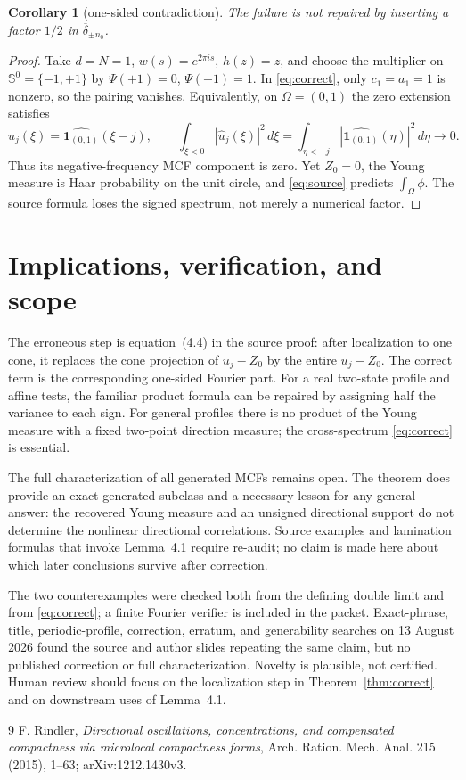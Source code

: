 \documentclass[11pt]{article}
\newtheorem{corollary}[theorem]{Corollary}
\newcommand{\Sph}{\mathbb S}
\newcommand{\one}{\mathbf 1}
\begin{document}
\begin{corollary}[one-sided contradiction]\label{cor:complex}
The failure is not repaired by inserting a factor $1/2$ in
$\overline\delta_{\pm n_0}$.
\end{corollary}

\begin{proof}
Take $d=N=1$, $w(s)=e^{2\pi i s}$, $h(z)=z$, and choose the multiplier on
$\Sph^0=\{-1,+1\}$ by $\Psi(+1)=0$, $\Psi(-1)=1$.  In
\eqref{eq:correct}, only $c_1=a_1=1$ is nonzero, so the pairing vanishes.
Equivalently, on $\Omega=(0,1)$ the zero extension satisfies
\[
 \widehat u_j(\xi)=\widehat{\one_{(0,1)}}(\xi-j),\qquad
 \int_{\xi<0}|\widehat u_j(\xi)|^2\,d\xi
 =\int_{\eta<-j}|\widehat{\one_{(0,1)}}(\eta)|^2\,d\eta\longrightarrow0.
\]
Thus its negative-frequency MCF component is zero.  Yet $Z_0=0$, the Young
measure is Haar probability on the unit circle, and \eqref{eq:source}
predicts $\int_\Omega\phi$.  The source formula loses the signed spectrum,
not merely a numerical factor.
\end{proof}

\section{Implications, verification, and scope}

The erroneous step is equation~(4.4) in the source proof: after localization
to one cone, it replaces the cone projection of $u_j-Z_0$ by the entire
$u_j-Z_0$.  The correct term is the corresponding one-sided Fourier part.
For a real two-state profile and affine tests, the familiar product formula
can be repaired by assigning half the variance to each sign.  For general
profiles there is no product of the Young measure with a fixed two-point
direction measure; the cross-spectrum \eqref{eq:correct} is essential.

The full characterization of all generated MCFs remains open.  The theorem
does provide an exact generated subclass and a necessary lesson for any
general answer: the recovered Young measure and an unsigned directional
support do not determine the nonlinear directional correlations.  Source
examples and lamination formulas that invoke Lemma~4.1 require re-audit; no
claim is made here about which later conclusions survive after correction.

The two counterexamples were checked both from the defining double limit and
from \eqref{eq:correct}; a finite Fourier verifier is included in the packet.
Exact-phrase, title, periodic-profile, correction, erratum, and generability
searches on 13 August 2026 found the source and author slides repeating the
same claim, but no published correction or full characterization.  Novelty
is plausible, not certified.  Human review should focus on the localization
step in Theorem~\ref{thm:correct} and on downstream uses of Lemma~4.1.

\begin{thebibliography}{9}
F. Rindler,
\emph{Directional oscillations, concentrations, and compensated compactness
via microlocal compactness forms},
Arch. Ration. Mech. Anal. 215 (2015), 1--63;
arXiv:1212.1430v3.
\end{thebibliography}
\end{document}
